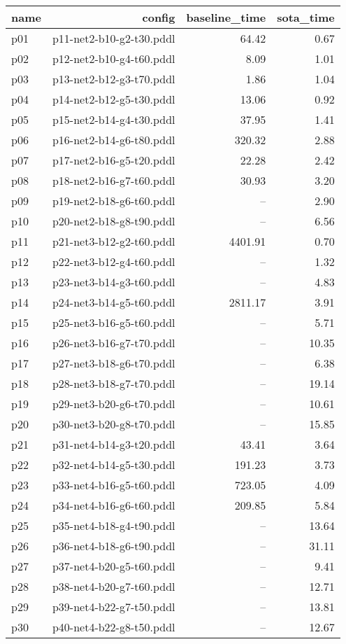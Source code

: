 \documentclass{article}
\begin{document}
                            \begin{center}
                            \scriptsize
                            \begin{tabular}{@{}l|r|r|r@{}}
                            name & config & baseline\_time & sota\_time\\\midrule
                              p01& p11-net2-b10-g2-t30.pddl&64.42&0.67\\
  p02& p12-net2-b10-g4-t60.pddl&8.09&1.01\\
  p03& p13-net2-b12-g3-t70.pddl&1.86&1.04\\
  p04& p14-net2-b12-g5-t30.pddl&13.06&0.92\\
  p05& p15-net2-b14-g4-t30.pddl&37.95&1.41\\
  p06& p16-net2-b14-g6-t80.pddl&320.32&2.88\\
  p07& p17-net2-b16-g5-t20.pddl&22.28&2.42\\
  p08& p18-net2-b16-g7-t60.pddl&30.93&3.20\\
  p09& p19-net2-b18-g6-t60.pddl&--&2.90\\
  p10& p20-net2-b18-g8-t90.pddl&--&6.56\\
  p11& p21-net3-b12-g2-t60.pddl&4401.91&0.70\\
  p12& p22-net3-b12-g4-t60.pddl&--&1.32\\
  p13& p23-net3-b14-g3-t60.pddl&--&4.83\\
  p14& p24-net3-b14-g5-t60.pddl&2811.17&3.91\\
  p15& p25-net3-b16-g5-t60.pddl&--&5.71\\
  p16& p26-net3-b16-g7-t70.pddl&--&10.35\\
  p17& p27-net3-b18-g6-t70.pddl&--&6.38\\
  p18& p28-net3-b18-g7-t70.pddl&--&19.14\\
  p19& p29-net3-b20-g6-t70.pddl&--&10.61\\
  p20& p30-net3-b20-g8-t70.pddl&--&15.85\\
  p21& p31-net4-b14-g3-t20.pddl&43.41&3.64\\
  p22& p32-net4-b14-g5-t30.pddl&191.23&3.73\\
  p23& p33-net4-b16-g5-t60.pddl&723.05&4.09\\
  p24& p34-net4-b16-g6-t60.pddl&209.85&5.84\\
  p25& p35-net4-b18-g4-t90.pddl&--&13.64\\
  p26& p36-net4-b18-g6-t90.pddl&--&31.11\\
  p27& p37-net4-b20-g5-t60.pddl&--&9.41\\
  p28& p38-net4-b20-g7-t60.pddl&--&12.71\\
  p29& p39-net4-b22-g7-t50.pddl&--&13.81\\
  p30& p40-net4-b22-g8-t50.pddl&--&12.67
                            \end{tabular}
                            \end{center}
                    
\end{document}
